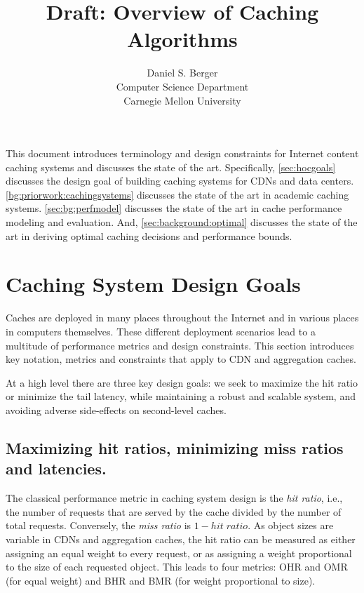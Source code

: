 \documentclass{article}
\begin{document}
\title{Draft: Overview of Caching Algorithms}
\author{Daniel S. Berger \\ Computer Science Department \\ Carnegie Mellon University}
\maketitle


This document introduces terminology and design constraints for Internet content caching systems and discusses the state of the art.
Specifically, \autoref{sec:hocgoals} discusses the design goal of building caching systems for CDNs and data centers.
\autoref{bg:priorwork:cachingsystems} discusses the state of the art in academic caching systems.
\autoref{sec:bg:perfmodel} discusses the state of the art in cache performance modeling and evaluation.
And, \autoref{sec:background:optimal} discusses the state of the art in deriving optimal caching decisions and performance bounds.

\section{Caching System Design Goals}\label{sec:hocgoals}

Caches are deployed in many places throughout the Internet and in various places in computers themselves.
These different deployment scenarios lead to a multitude of performance metrics and design constraints.
This section introduces key notation, metrics and constraints that apply to CDN and aggregation caches.

At a high level there are three key design goals: we seek to maximize the hit ratio or minimize the tail latency, while maintaining a robust and scalable system, and avoiding adverse side-effects on second-level caches.







\subsection{Maximizing hit ratios, minimizing miss ratios and latencies.}

The classical performance metric in caching system design is the \emph{hit ratio}, i.e., the number of requests that are served by the cache divided by the number of total requests.
Conversely, the \emph{miss ratio} is $1-hit\;ratio$.
As object sizes are variable in CDNs and aggregation caches, the hit ratio can be measured as either assigning an equal weight to every request, or as assigning a weight proportional to the size of each requested object.
This leads to four metrics: OHR and OMR (for equal weight) and BHR and BMR (for weight proportional to size).
\end{document}
